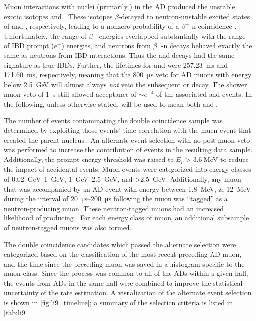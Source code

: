 Muon interactions with nuclei (primarily ) in the AD
produced the unstable exotic isotopes \li{} and \he{}.
These isotopes $\beta$-decayed to neutron-unstable excited states
of  and , respectively,
leading to a nonzero probability of a $\beta^{-}$-n coincidence \cite{kamland_li9}.
Unfortunately, the range of $\beta^-$ energies overlapped substantially
with the range of IBD prompt ($e^+$) energies,
and neutrons from $\beta^-$-n decays behaved
exactly the same as neutrons from IBD interactions.
Thus the \li{} and \he{} decays had the same signature as true IBDs.
Further, the lifetimes for \li{} and \he{} were
\SI{257.23}{\ms} and \SI{171.60}{\ms}, respectively,
meaning that the \SI{800}{\us} veto for AD muons
with energy below \SI{2.5}{\GeV} will almost always
\emph{not} veto the subsequent \li{} or \he{} decay.
The shower muon veto of \SI{1}{\s} still allowed acceptance of
${\sim}e^{-4}$ of the associated \li{} and \he{} events.
In the following, unless otherwise stated,
\li{} will be used to mean both \li{} and \he{}.

The number of \li{} events contaminating the double coincidence sample
was determined by exploiting those events' time correlation
with the muon event that created the parent \li{} nucleus \cite{jinjing_2020may}.
An alternate event selection with no post-muon veto
was performed to increase the contribution of \li{} events
in the resulting data sample.
Additionally, the prompt-energy threshold
was raised to $E_p > \SI{3.5}{\MeV}$
to reduce the impact of accidental events.
Muon events were categorized into energy classes
of \SIrange{0.02}{1}{\GeV}, \SIrange{1}{2.5}{\GeV},
and \SI{>2.5}{\GeV}.
Additionally, any muon that was accompanied by
an AD event with energy between \SIlist{1.8;12}{\MeV}
during the interval of \SIrange{20}{200}{\us} following the muon
was ``tagged'' as a neutron-producing muon.
These neutron-tagged muons had an increased likelihood
of producing \li{}.
For each energy class of muon,
an additional subsample of neutron-tagged muons was also formed.

The double coincidence candidates which passed the alternate selection
were categorized based on the classification
of the most recent preceding AD muon,
and the time since the preceding muon
was saved in a histogram specific to the muon class.
Since the \li{} process was common to all of the ADs within a given hall,
the events from ADs in the same hall were combined
to improve the statistical uncertainty of the rate estimation.
A visualization of the alternate event selection
is shown in \cref{fig:li9_timeline};
a summary of the selection criteria is listed in \cref{tab:li9}.

